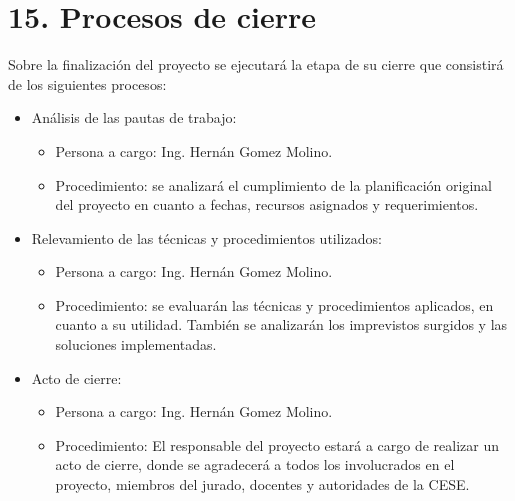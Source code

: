 \documentclass[
11pt, %
codirector, %
]{charter}
\begin{document}
\begin{itemize}
\end{itemize}

\section{15. Procesos de cierre}    
\label{sec:cierre}

Sobre la finalización del proyecto se ejecutará la etapa de su cierre que consistirá de los siguientes procesos:  

\begin{itemize}
	\item Análisis de las pautas de trabajo:
	\begin{itemize}
		\item Persona a cargo: Ing. Hernán Gomez Molino.
		\item Procedimiento: se analizará el cumplimiento de la planificación original del proyecto en cuanto a fechas, recursos asignados y requerimientos. 
		\end{itemize}
	\item Relevamiento de las técnicas y procedimientos utilizados:
	\begin{itemize}
		\item Persona a cargo: Ing. Hernán Gomez Molino. 
		\item Procedimiento: se evaluarán las técnicas y procedimientos aplicados, en cuanto a su utilidad. También se analizarán los imprevistos surgidos y las soluciones implementadas.
	\end{itemize}
	\item Acto de cierre:
	\begin{itemize}
		\item Persona a cargo: Ing. Hernán Gomez Molino. 
		\item Procedimiento: El responsable del proyecto estará a cargo de realizar un acto de cierre, donde se agradecerá a todos los involucrados en el proyecto, miembros del jurado, docentes y autoridades de la CESE. 
	\end{itemize}
\end{itemize}
\end{document}
